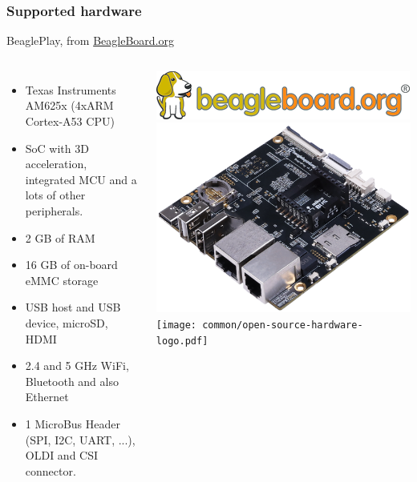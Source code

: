 \begin{frame}
\frametitle{Supported hardware}
  BeaglePlay, from
\href{https://beagleboard.org}{BeagleBoard.org}
  \begin{columns}
    \footnotesize
    \begin{itemize}
      \item Texas Instruments AM625x (4xARM Cortex-A53 CPU)
      \item SoC with 3D acceleration, integrated MCU and a lots of other peripherals.
      \item 2 GB of RAM
      \item 16 GB of on-board eMMC storage
      \item USB host and USB device, microSD, HDMI
      \item 2.4 and 5 GHz WiFi, Bluetooth and also Ethernet
      \item 1 MicroBus Header (SPI, I2C, UART, ...), OLDI and CSI connector.
    \end{itemize}
    \begin{center}
      \includegraphics[width=\textwidth]{slides/beagleplay-board/beagle_logo_326x60.png}\\
      \includegraphics[width=\textwidth]{slides/beagleplay-board/beagleplay.png}\\
      \texttt{[image: common/open-source-hardware-logo.pdf]}
    \end{center}
  \end{columns}
\end{frame}
